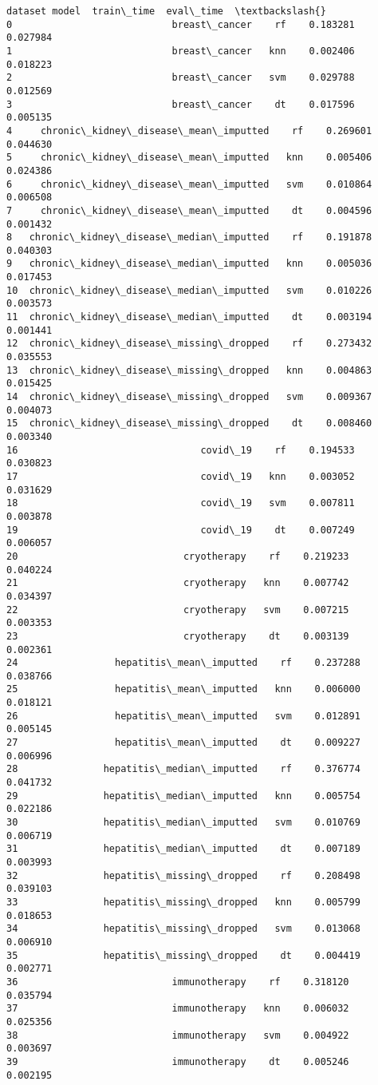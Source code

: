 \documentclass[11pt]{article}
\begin{document}
            \begin{tcolorbox}[breakable, size=fbox, boxrule=.5pt, pad at break*=1mm, opacityfill=0]
\begin{Verbatim}[commandchars=\\\{\}]
                                   dataset model  train\_time  eval\_time  \textbackslash{}
0                            breast\_cancer    rf    0.183281   0.027984
1                            breast\_cancer   knn    0.002406   0.018223
2                            breast\_cancer   svm    0.029788   0.012569
3                            breast\_cancer    dt    0.017596   0.005135
4     chronic\_kidney\_disease\_mean\_imputted    rf    0.269601   0.044630
5     chronic\_kidney\_disease\_mean\_imputted   knn    0.005406   0.024386
6     chronic\_kidney\_disease\_mean\_imputted   svm    0.010864   0.006508
7     chronic\_kidney\_disease\_mean\_imputted    dt    0.004596   0.001432
8   chronic\_kidney\_disease\_median\_imputted    rf    0.191878   0.040303
9   chronic\_kidney\_disease\_median\_imputted   knn    0.005036   0.017453
10  chronic\_kidney\_disease\_median\_imputted   svm    0.010226   0.003573
11  chronic\_kidney\_disease\_median\_imputted    dt    0.003194   0.001441
12  chronic\_kidney\_disease\_missing\_dropped    rf    0.273432   0.035553
13  chronic\_kidney\_disease\_missing\_dropped   knn    0.004863   0.015425
14  chronic\_kidney\_disease\_missing\_dropped   svm    0.009367   0.004073
15  chronic\_kidney\_disease\_missing\_dropped    dt    0.008460   0.003340
16                                covid\_19    rf    0.194533   0.030823
17                                covid\_19   knn    0.003052   0.031629
18                                covid\_19   svm    0.007811   0.003878
19                                covid\_19    dt    0.007249   0.006057
20                             cryotherapy    rf    0.219233   0.040224
21                             cryotherapy   knn    0.007742   0.034397
22                             cryotherapy   svm    0.007215   0.003353
23                             cryotherapy    dt    0.003139   0.002361
24                 hepatitis\_mean\_imputted    rf    0.237288   0.038766
25                 hepatitis\_mean\_imputted   knn    0.006000   0.018121
26                 hepatitis\_mean\_imputted   svm    0.012891   0.005145
27                 hepatitis\_mean\_imputted    dt    0.009227   0.006996
28               hepatitis\_median\_imputted    rf    0.376774   0.041732
29               hepatitis\_median\_imputted   knn    0.005754   0.022186
30               hepatitis\_median\_imputted   svm    0.010769   0.006719
31               hepatitis\_median\_imputted    dt    0.007189   0.003993
32               hepatitis\_missing\_dropped    rf    0.208498   0.039103
33               hepatitis\_missing\_dropped   knn    0.005799   0.018653
34               hepatitis\_missing\_dropped   svm    0.013068   0.006910
35               hepatitis\_missing\_dropped    dt    0.004419   0.002771
36                           immunotherapy    rf    0.318120   0.035794
37                           immunotherapy   knn    0.006032   0.025356
38                           immunotherapy   svm    0.004922   0.003697
39                           immunotherapy    dt    0.005246   0.002195


\end{Verbatim}
\end{tcolorbox}
\end{document}

